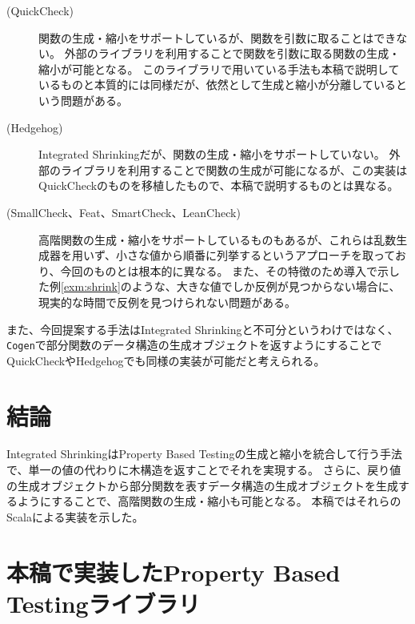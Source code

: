 \documentclass[a4paper,xelatex,ja=standard,jafont=noto]{bxjsarticle}
\theoremstyle{definition}
\begin{document}
\begin{description}
  \item[(QuickCheck\cite{claessen_quickcheck_2011})]
    関数の生成・縮小をサポートしているが、関数を引数に取ることはできない。
    外部のライブラリ\cite{quickcheck-higherorder_online}を利用することで関数を引数に取る関数の生成・縮小が可能となる。
    このライブラリで用いている手法も本稿で説明しているものと本質的には同様だが、依然として生成と縮小が分離しているという問題がある。
  \item[(Hedgehog\cite{hedgehog_online})]
    Integrated Shrinkingだが、関数の生成・縮小をサポートしていない。
    外部のライブラリ\cite{hedgehog-fn_online}を利用することで関数の生成が可能になるが、この実装はQuickCheckのものを移植したもので、本稿で説明するものとは異なる。
  \item[(SmallCheck\cite{runciman_smallcheck_2008}、Feat\cite{duregaard_feat_2012}、SmartCheck\cite{pike_smartcheck_2014}、LeanCheck\cite{matela_braquehais_tools_2017})]
    高階関数の生成・縮小をサポートしているものもあるが、これらは乱数生成器を用いず、小さな値から順番に列挙するというアプローチを取っており、今回のものとは根本的に異なる。
    また、その特徴のため導入で示した例\ref{exm:shrink}のような、大きな値でしか反例が見つからない場合に、現実的な時間で反例を見つけられない問題がある。
\end{description}

また、今回提案する手法はIntegrated Shrinkingと不可分というわけではなく、\texttt{Cogen}で部分関数のデータ構造の生成オブジェクトを返すようにすることでQuickCheckやHedgehogでも同様の実装が可能だと考えられる。

\section{結論}

Integrated ShrinkingはProperty Based Testingの生成と縮小を統合して行う手法で、単一の値の代わりに木構造を返すことでそれを実現する。
さらに、戻り値の生成オブジェクトから部分関数を表すデータ構造の生成オブジェクトを生成するようにすることで、高階関数の生成・縮小も可能となる。
本稿ではそれらのScalaによる実装を示した。



\appendix

\section{本稿で実装したProperty Based Testingライブラリ}\label{sec:appndix-1}

\inputminted[breaklines]{scala}{../src/main/scala/minicheck.scala}
\end{document}
